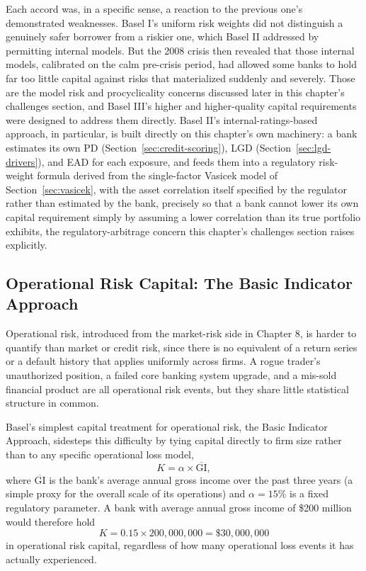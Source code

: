 \documentclass[../ai_in_finance]{subfiles}
\begin{document}
Each accord was, in a specific sense, a reaction to the previous one's demonstrated weaknesses. Basel I's uniform risk weights did not distinguish a genuinely safer borrower from a riskier one, which Basel II addressed by permitting internal models. But the 2008 crisis then revealed that those internal models, calibrated on the calm pre-crisis period, had allowed some banks to hold far too little capital against risks that materialized suddenly and severely. Those are the model risk and procyclicality concerns discussed later in this chapter's challenges section, and Basel III's higher and higher-quality capital requirements were designed to address them directly.
Basel II's internal-ratings-based approach, in particular, is built directly on this chapter's own machinery: a bank estimates its own PD (Section~\ref{sec:credit-scoring}), LGD (Section~\ref{sec:lgd-drivers}), and EAD for each exposure, and feeds them into a regulatory risk-weight formula derived from the single-factor Vasicek model of Section~\ref{sec:vasicek}, with the asset correlation itself specified by the regulator rather than estimated by the bank, precisely so that a bank cannot lower its own capital requirement simply by assuming a lower correlation than its true portfolio exhibits, the regulatory-arbitrage concern this chapter's challenges section raises explicitly.

\subsection{Operational Risk Capital: The Basic Indicator Approach}

Operational risk, introduced from the market-risk side in Chapter 8, is harder to quantify than market or credit risk, since there is no equivalent of a return series or a default history that applies uniformly across firms. A rogue trader's unauthorized position, a failed core banking system upgrade, and a mis-sold financial product are all operational risk events, but they share little statistical structure in common.

Basel's simplest capital treatment for operational risk, the Basic Indicator Approach, sidesteps this difficulty by tying capital directly to firm size rather than to any specific operational loss model,
\begin{equation*}
K = \alpha \times \overline{\text{GI}},
\end{equation*}
where $\overline{\text{GI}}$ is the bank's average annual gross income over the past three years (a simple proxy for the overall scale of its operations) and $\alpha=15\%$ is a fixed regulatory parameter. A bank with average annual gross income of \$200 million would therefore hold
\begin{equation*}
K = 0.15 \times 200{,}000{,}000 = \$30{,}000{,}000
\end{equation*}
in operational risk capital, regardless of how many operational loss events it has actually experienced.
\end{document}
